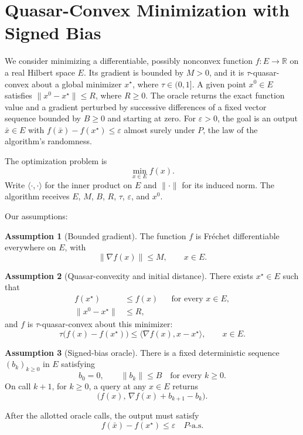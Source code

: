\documentclass[10pt]{article}
\theoremstyle{definition}
\newtheorem{assumption}{Assumption}
\begin{document}
\section*{Quasar-Convex Minimization with Signed Bias}
We consider minimizing a differentiable, possibly nonconvex function $f:E\to\mathbb{R}$ on a real Hilbert space $E$. Its gradient is bounded by $M>0$, and it is $\tau$-quasar-convex about a global minimizer $x^\star$, where $\tau\in(0,1]$. A given point $x^0\in E$ satisfies $\|x^0-x^\star\|\leq R$, where $R\geq0$. The oracle returns the exact function value and a gradient perturbed by successive differences of a fixed vector sequence bounded by $B\geq0$ and starting at zero. For $\varepsilon>0$, the goal is an output $\bar{x}\in E$ with $f(\bar{x})-f(x^\star)\leq\varepsilon$ almost surely under $P$, the law of the algorithm's randomness.

The optimization problem is
\[
\min_{x\in E} f(x).
\]
Write $\langle\cdot,\cdot\rangle$ for the inner product on $E$ and $\|\cdot\|$ for its induced norm. The algorithm receives $E$, $M$, $B$, $R$, $\tau$, $\varepsilon$, and $x^0$.

Our assumptions:
\begin{assumption}[Bounded gradient]
The function $f$ is Fr\'echet differentiable everywhere on $E$, with
\[
\|\nabla f(x)\|\leq M,
\qquad x\in E.
\]
\end{assumption}

\begin{assumption}[Quasar-convexity and initial distance]
There exists $x^\star\in E$ such that
\[
\begin{aligned}
f(x^\star)&\leq f(x) &&\text{for every }x\in E,\\
\|x^0-x^\star\|&\leq R,
\end{aligned}
\]
and $f$ is $\tau$-quasar-convex about this minimizer:
\[
\tau\bigl(f(x)-f(x^\star)\bigr)
\leq \langle\nabla f(x),x-x^\star\rangle,
\qquad x\in E.
\]
\end{assumption}

\begin{assumption}[Signed-bias oracle]
There is a fixed deterministic sequence $(b_k)_{k\geq0}$ in $E$ satisfying
\[
b_0=0,\qquad \|b_k\|\leq B\quad\text{for every }k\geq0.
\]
On call $k+1$, for $k\geq0$, a query at any $x\in E$ returns
\[
\bigl(f(x),\,\nabla f(x)+b_{k+1}-b_k\bigr).
\]
\end{assumption}

After the allotted oracle calls, the output must satisfy
\[
f(\bar{x})-f(x^\star)\leq\varepsilon
\quad P\text{-a.s.}
\]
\end{document}
